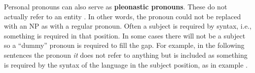 \documentclass[a4paper]{article}
\begin{document}
% 
% 
% 
% 
% 
% 

Personal pronouns can also serve as {\bf pleonastic pronouns}. These do not
actually refer to an entity \cite[p. 5]{GuillouEtAlGuide}. In other words, the
pronoun could not be replaced with an NP as with a regular pronoun. Often a
subject is required by syntax, i.e., something is required in that position. In
some cases there will not be a subject so a ``dummy'' pronoun is required to
fill the gap. For example, in the following sentences the pronoun {\sl it} does
not refer to anything but is included as something is required by the syntax of
the language in the subject position, as in example \Next.
\end{document}
